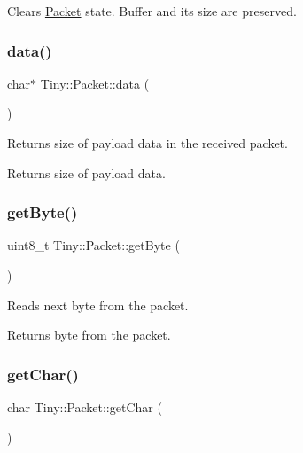 Clears \hyperlink{classTiny_1_1Packet}{Packet} state. Buffer and its size are preserved. \mbox{\label{classTiny_1_1Packet_a3307ba504caba9c5eee8f1f32cf1a749}} 
\subsubsection{\texorpdfstring{data()}{data()}}
{\footnotesize\ttfamily char$\ast$ Tiny\+::\+Packet\+::data (\begin{DoxyParamCaption}{ }\end{DoxyParamCaption})\hspace{0.3cm}{\ttfamily [inline]}}

Returns size of payload data in the received packet. \begin{DoxyReturn}{Returns}
size of payload data. 
\end{DoxyReturn}
\mbox{\label{classTiny_1_1Packet_a152feac05d3e972f614c17c36bf30513}} 
\subsubsection{\texorpdfstring{get\+Byte()}{getByte()}}
{\footnotesize\ttfamily uint8\+\_\+t Tiny\+::\+Packet\+::get\+Byte (\begin{DoxyParamCaption}{ }\end{DoxyParamCaption})\hspace{0.3cm}{\ttfamily [inline]}}

Reads next byte from the packet. \begin{DoxyReturn}{Returns}
byte from the packet. 
\end{DoxyReturn}
\mbox{\label{classTiny_1_1Packet_a260645f9d055da878f149a13ecd58844}} 
\subsubsection{\texorpdfstring{get\+Char()}{getChar()}}
{\footnotesize\ttfamily char Tiny\+::\+Packet\+::get\+Char (\begin{DoxyParamCaption}{ }\end{DoxyParamCaption})\hspace{0.3cm}{\ttfamily [inline]}}

